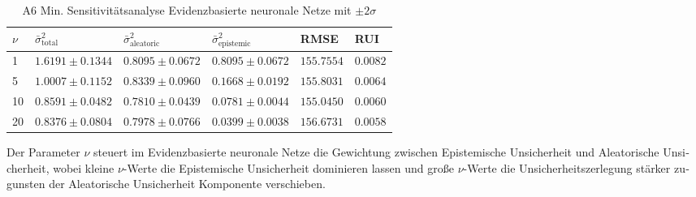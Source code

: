 \begin{otherlanguage}{ngerman}
\begin{table}[!htbp]
\centering
\footnotesize
\begin{tabularx}{\textwidth}{|X|X|X|X|X|X|}
\hline
\vspace{0.15em}$\nu$\vspace{0.25em}
& \vspace{0.15em}$\bar{\sigma}^2_{\text{total}}$\vspace{0.25em}
& \vspace{0.15em}$\bar{\sigma}^2_{\text{aleatoric}}$\vspace{0.25em}
& \vspace{0.15em}$\bar{\sigma}^2_{\text{epistemic}}$\vspace{0.25em}
& \vspace{0.15em}RMSE\vspace{0.25em}
& \vspace{0.15em}RUI\vspace{0.25em} \\
\hline
1  & $1.6191 \pm 0.1344$ & $0.8095 \pm 0.0672$ & $0.8095 \pm 0.0672$ & $155.7554$ & $0.0082$ \\
\hline
5  & $1.0007 \pm 0.1152$ & $0.8339 \pm 0.0960$ & $0.1668 \pm 0.0192$ & $155.8031$ & $0.0064$ \\
\hline
10 & $0.8591 \pm 0.0482$ & $0.7810 \pm 0.0439$ & $0.0781 \pm 0.0044$ & $155.0450$ & $0.0060$ \\
\hline
20 & $0.8376 \pm 0.0804$ & $0.7978 \pm 0.0766$ & $0.0399 \pm 0.0038$ & $156.6731$ & $0.0058$ \\
\hline
\end{tabularx}
\caption{A6 Min. Sensitivitätsanalyse \gls{Evidenzbasierte neuronale Netze} mit $\pm 2\sigma$}
\label{tab:enn_results}
\end{table}

Der Parameter $\nu$ steuert im \gls{Evidenzbasierte neuronale Netze} die Gewichtung zwischen \gls{Epistemische Unsicherheit} und \gls{Aleatorische Unsicherheit}, wobei kleine $\nu$-Werte die \gls{Epistemische Unsicherheit} dominieren lassen und große $\nu$-Werte die Unsicherheitszerlegung stärker zugunsten der \gls{Aleatorische Unsicherheit} Komponente verschieben.

\newline


\end{otherlanguage}
